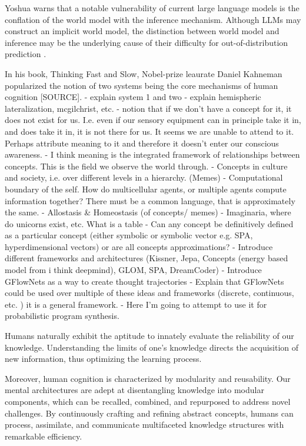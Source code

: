 Yoshua warns that a notable vulnerability of current large language models is the conflation of the world model with the inference mechanism. Although LLMs may construct an implicit world model, the distinction between world model and inference may be the underlying cause of their difficulty for out-of-distribution prediction \cite{goyal_inductive_2022, yoshuabengioScalingService}.

In his book, Thinking Fast and Slow, Nobel-prize leaurate Daniel Kahneman popularized the notion of two systems being the core mechanisms of human cognition [SOURCE]. 
- explain system 1 and two 
- explain hemispheric lateralization, mcgilchrist, etc.
- notion that if we don't have a concept for it, it does not exist for us. I.e. even if our sensory equipment can in principle take it in, and does take it in, it is not there for us. It seems we are unable to attend to it. Perhaps attribute meaning to it and therefore it doesn't enter our conscious awareness.
- I think meaning is the integrated framework of relationships between concepts. This is the field we observe the world through. 
- Concepts in culture and society, i.e. over different levels in a hierarchy. (Memes)
- Computational boundary of the self. How do multicellular agents, or multiple agents compute information together? There must be a common language, that is approximately the same.
- Allostasis \& Homeostasis (of concepts/ memes)
- Imaginaria, where do unicorns exist, etc. What is a table
- Can any concept be definitively defined as a particular concept (either symbolic or symbolic vector e.g. SPA, hyperdimensional vectors) or are all concepts approximations?
- Introduce different frameworks and architectures (Kissner, Jepa, Concepts (energy based model from i think deepmind), GLOM, SPA, DreamCoder)
- Introduce GFlowNets as a way to create thought trajectories
- Explain that GFlowNets could be used over multiple of these ideas and frameworks (discrete, continuous, etc. ) it is a general framework.
- Here I'm going to attempt to use it for probabilistic program synthesis.



Humans naturally exhibit the aptitude to innately evaluate the reliability of our knowledge. Understanding the limits of one's knowledge directs the acquisition of new information, thus optimizing the learning process.

Moreover, human cognition is characterized by modularity and reusability. Our mental architectures are adept at disentangling knowledge into modular components, which can be recalled, combined, and repurposed to address novel challenges.
By continuously crafting and refining abstract concepts, humans can process, assimilate, and communicate multifaceted knowledge structures with remarkable efficiency.

